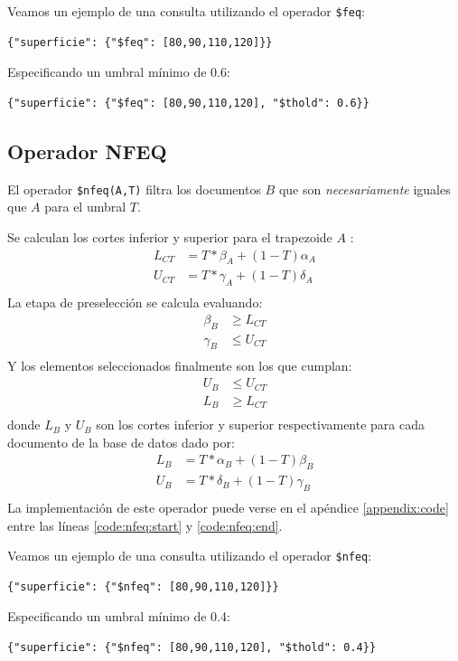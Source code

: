 \begin{example}
Veamos un ejemplo de una consulta utilizando el operador \texttt{\$feq}:
%
\begin{verbatim}
{"superficie": {"$feq": [80,90,110,120]}}
\end{verbatim}
%
Especificando un umbral mínimo de 0.6:
%
\begin{verbatim}         
{"superficie": {"$feq": [80,90,110,120], "$thold": 0.6}}
\end{verbatim}

\end{example}

\subsection{Operador NFEQ}

El operador \texttt{\$nfeq(A,T)} filtra los documentos $B$ que son \textit{necesariamente} iguales que $A$ para el umbral $T$.

Se calculan los cortes inferior y superior para el trapezoide $A$ \cite{indexingneccesary}:
%
\begin{align*}
    L_{CT} &= T * \beta_A + (1-T)\alpha_A \\
    U_{CT} &= T * \gamma_A + (1-T)\delta_A \\
\end{align*}
%
La etapa de preselección se calcula evaluando:
%
\begin{align*}
    \beta_B &\geq L_{CT} \\
    \gamma_B &\leq U_{CT} \\
\end{align*}
%
Y los elementos seleccionados finalmente son los que cumplan:
%
\begin{align*}
    U_B &\leq U_{CT} \\
    L_B &\geq L_{CT} \\
\end{align*}
%
donde $L_B$ y $U_B$ son los cortes inferior y superior respectivamente para cada documento de la base de datos dado por:
%
\begin{align*}
    L_B &= T * \alpha_B + (1-T)\beta_B \\
    U_B &= T * \delta_B + (1-T)\gamma_B \\
\end{align*}
%
La implementación de este operador puede verse en el apéndice \ref{appendix:code} entre las líneas \ref{code:nfeq:start} y \ref{code:nfeq:end}.

\begin{example}
Veamos un ejemplo de una consulta utilizando el operador \texttt{\$nfeq}:
%
\begin{verbatim}
{"superficie": {"$nfeq": [80,90,110,120]}}
\end{verbatim}
%
Especificando un umbral mínimo de 0.4:
%
\begin{verbatim}         
{"superficie": {"$nfeq": [80,90,110,120], "$thold": 0.4}}
\end{verbatim}

\end{example}

